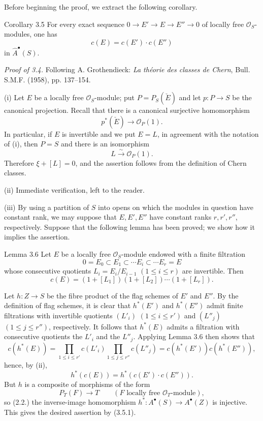 Before beginning the proof, we extract the following corollary.

\begin{statement}{Corollary 3.5}
For every exact sequence $0\to E'\to E\to E''\to0$ of locally free $\mathcal O_S$-modules, one has
\[
c(E)=c(E')\cdot c(E'')
\]
in $\widehat A^{\bullet}(S)$.
\end{statement}

\emph{Proof of 3.4.} Following A. Grothendieck: \emph{La théorie des classes de Chern}, Bull. S.M.F. (1958), pp. 137--154.

(i) Let $E$ be a locally free $\mathcal O_S$-module; put $P=P_S(\check E)$ and let $p:P\to S$ be the canonical projection. Recall that there is a canonical surjective homomorphism
\[
p^*(\check E)\longrightarrow \mathcal O_P(1).
\]
In particular, if $E$ is invertible and we put $E=L$, in agreement with the notation of (i), then $P=S$ and there is an isomorphism
\[
L\xrightarrow{\sim}\mathcal O_P(1).
\]
Therefore $\xi+[L]=0$, and the assertion follows from the definition of Chern classes.

(ii) Immediate verification, left to the reader.

(iii) By using a partition of $S$ into opens on which the modules in question have constant rank, we may suppose that $E,E',E''$ have constant ranks $r,r',r''$, respectively. Suppose that the following lemma has been proved; we show how it implies the assertion.

\begin{statement}{Lemma 3.6}
Let $E$ be a locally free $\mathcal O_S$-module endowed with a finite filtration
\[
0=E_0\subset E_1\subset\cdots E_i\subset\cdots E_r=E
\]
whose consecutive quotients $L_i=E_i/E_{i-1}$ $(1\le i\le r)$ are invertible. Then
\[
c(E)=(1+[L_1])(1+[L_2])\cdots(1+[L_r]).
\]
\end{statement}

Let $h:Z\to S$ be the fibre product of the flag schemes of $E'$ and $E''$. By the definition of flag schemes, it is clear that $h^*(E')$ and $h^*(E'')$ admit finite filtrations with invertible quotients $(L'_i)$ $(1\le i\le r')$ and $(L''_j)$ $(1\le j\le r'')$, respectively. It follows that $h^*(E)$ admits a filtration with consecutive quotients the $L'_i$ and the $L''_j$. Applying Lemma 3.6 then shows that
\[
c(h^*(E))=
\prod_{1\le i\le r'}c(L'_i)\prod_{1\le j\le r''}c(L''_j)
=c(h^*(E'))c(h^*(E'')),
\]
hence, by (ii),
\[
h^*(c(E))=h^*(c(E')\cdot c(E'')).
\tag{3.5.1}
\]
But $h$ is a composite of morphisms of the form
\[
P_T(F)\longrightarrow T
\qquad (F\text{ locally free }\mathcal O_T\text{-module}),
\]
so (2.2.) the inverse-image homomorphism $h^*:A^{\bullet}(S)\to A^{\bullet}(Z)$ is injective. This gives the desired assertion by (3.5.1).

